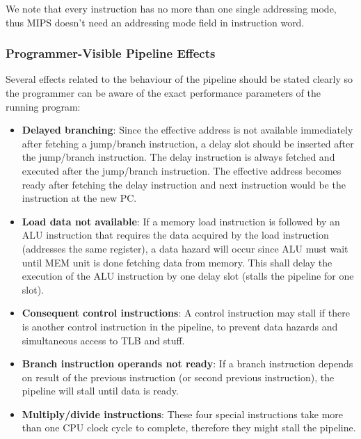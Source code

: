 \documentclass[oneside]{book}
\begin{document}
We note that every instruction has no more than one single addressing
mode, thus MIPS doesn't need an addressing mode field in instruction
word.

\subsubsection{Programmer-Visible Pipeline Effects}

Several effects related to the behaviour of the pipeline should be stated
clearly so the programmer can be aware of the exact performance parameters
of the running program:

\begin{itemize}

\item \textbf{Delayed branching}: Since the effective address is not available
      immediately after fetching a jump/branch instruction, a delay
      slot should be inserted after the jump/branch instruction. The
      delay instruction is always fetched and executed after the
      jump/branch instruction. The effective address becomes ready
      after fetching the delay instruction and next instruction
      would be the instruction at the new PC.

\item \textbf{Load data not available}: If a memory load instruction is
      followed by an ALU instruction that requires the data
      acquired by the load instruction (addresses the same
      register), a data hazard will occur since ALU must wait
      until MEM unit is done fetching data from memory. This
      shall delay the execution of the ALU instruction by
      one delay slot (stalls the pipeline for one slot).

\item \textbf{Consequent control instructions}: A control instruction
      may stall if there is another control instruction
      in the pipeline, to prevent data hazards and simultaneous
      access to TLB and stuff.

\item \textbf{Branch instruction operands not ready}:
      If a branch instruction depends on result of the previous
      instruction (or second previous instruction), the pipeline
      will stall until data is ready.

\item \textbf{Multiply/divide instructions}: These four special
      instructions take more than one CPU clock cycle to complete,
      therefore they might stall the pipeline.


\end{itemize}
\end{document}
